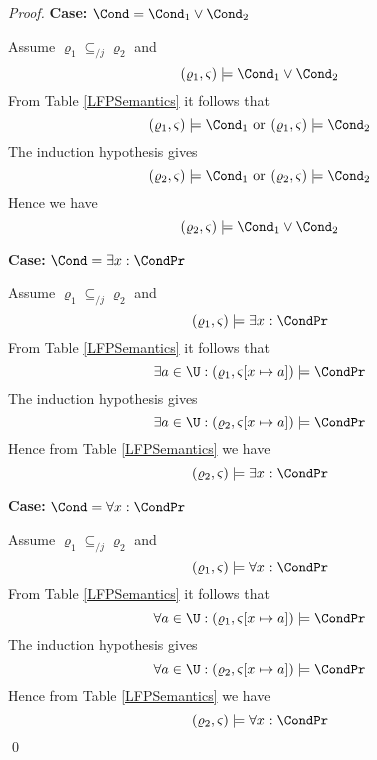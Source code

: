 \begin{proof}
\noindent \textbf{Case: }$\Cond=\Cond_1 \vee \Cond_2$

\noindent Assume $\varrho_1 \subseteq_{/j} \varrho_2$ and
$$
(\varrho_1,\varsigma) \models \Cond_1 \vee \Cond_2
$$
From Table \ref{LFPSemantics} it follows that
$$
(\varrho_1,\varsigma) \models \Cond_1 \text{ or } (\varrho_1,\varsigma) \models \Cond_2
$$
The induction hypothesis gives
$$
(\varrho_2,\varsigma) \models \Cond_1 \text{ or } (\varrho_2,\varsigma) \models \Cond_2
$$
Hence we have 
$$
(\varrho_2,\varsigma) \models \Cond_1 \vee \Cond_2
$$

\noindent \textbf{Case: }$\Cond=\exists x: \CondPr$

\noindent Assume $\varrho_1 \subseteq_{/j} \varrho_2$ and
$$
(\varrho_1,\varsigma) \models \exists x: \CondPr
$$
From Table \ref{LFPSemantics} it follows that
$$
\exists a \in \U: (\varrho_1,\varsigma[x \mapsto a]) \models \CondPr
$$
The induction hypothesis gives
$$
\exists a \in \U: (\varrho_2,\varsigma[x \mapsto a]) \models \CondPr
$$
Hence from Table \ref{LFPSemantics} we have
$$
(\varrho_2,\varsigma) \models \exists x: \CondPr
$$

\noindent \textbf{Case: }$\Cond=\forall x: \CondPr$

\noindent Assume $\varrho_1 \subseteq_{/j} \varrho_2$ and
$$
(\varrho_1,\varsigma) \models \forall x: \CondPr
$$
From Table \ref{LFPSemantics} it follows that
$$
\forall a \in \U: (\varrho_1,\varsigma[x \mapsto a]) \models \CondPr
$$
The induction hypothesis gives
$$
\forall a \in \U: (\varrho_2,\varsigma[x \mapsto a]) \models \CondPr
$$
Hence from Table \ref{LFPSemantics} we have
$$
(\varrho_2,\varsigma) \models \forall x: \CondPr
$$
\qed
\end{proof}

